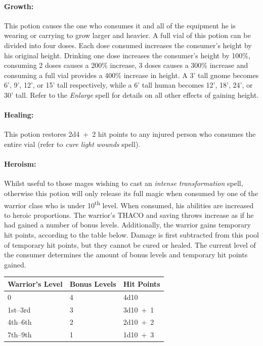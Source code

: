 \begin{multicols}{2}
\paragraph{Growth:} This potion causes the one who consumes it and all of the equipment he is wearing or carrying to grow larger and heavier.  A full vial of this potion can be divided into four doses.  Each dose consumed increases the consumer's height by his original height.  Drinking one dose increases the consumer's height by 100\%, consuming 2 doses causes a 200\% increase, 3 doses causes a 300\% increase and consuming a full vial provides a 400\% increase in height.  A 3' tall gnome becomes 6', 9', 12', or 15' tall respectively, while a 6' tall human becomes 12', 18', 24', or 30' tall.  Refer to the \textit{Enlarge} spell for details on all other effects of gaining height.

\paragraph{Healing:} This potion restores 2d4~+~2 hit points to any injured person who consumes the entire vial (refer to \textit{cure light wounds} spell).

\paragraph{Heroism:} Whilst useful to those mages wishing to cast an \textit{intense transformation} spell, otherwise this potion will only release its full magic when consumed by one of the warrior class who is under 10\textsuperscript{th} level.  When consumed, his abilities are increased to heroic proportions.  The warrior's THACO and saving throws increase as if he had gained a number of bonus levels.  Additionally, the warrior gains temporary hit points, according to the table below.  Damage is first subtracted from this pool of temporary hit points, but they cannot be cured or healed.  The current level of the consumer determines the amount of bonus levels and temporary hit points gained.

\noindent
\begin{tabular}{|p{}|p{}|p{}|}
\hline
Warrior's Level	& Bonus Levels	& Hit Points \\
\hline\hline
\rowcolor[gray]{.9}0	& 4	& 4d10 \\
1st--3rd	& 3	& 3d10~+~1 \\
\rowcolor[gray]{.9}4th--6th	& 2	& 2d10~+~2 \\
7th--9th	& 1	& 1d10~+~3 \\
\hline
\end{tabular}


\end{multicols}
